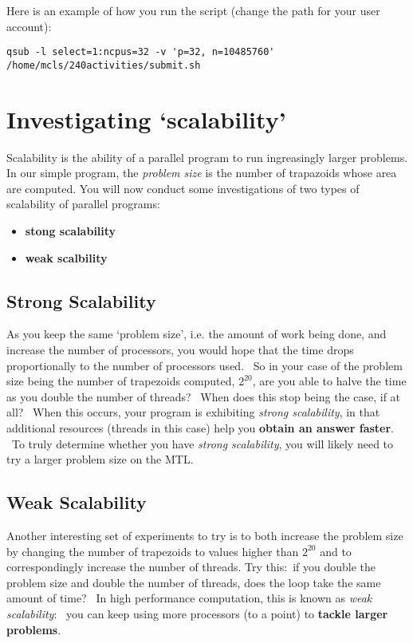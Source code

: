 \documentclass[letterpaper,10pt,openany,oneside]{sphinxmanual}
\begin{document}
Here is an example of how you run the script (change the path for your
user account):

\begin{Verbatim}[commandchars=\\\{\}]
qsub -l select=1:ncpus=32 -v 'p=32, n=10485760'
/home/mcls/240activities/submit.sh
\end{Verbatim}


\section{Investigating ‘scalability’}
\label{timingAndScalability/TimingOnMTLandscalability:investigating-scalability}
Scalability is the ability of a parallel program to run ingreasingly larger problems.  In our simple program, the \emph{problem size} is the number of trapazoids whose area are computed.  You will now conduct some investigations of two types of scalability of parallel programs:
\begin{itemize}
\item {} 
\textbf{stong scalability}

\item {} 
\textbf{weak scalbility}

\end{itemize}


\subsection{Strong Scalability}
\label{timingAndScalability/TimingOnMTLandscalability:strong-scalability}
As you keep the same ‘problem size’, i.e. the amount of work being done,
and increase the number of processors, you would hope that the time
drops proportionally to the number of processors used.  So in your case
of the problem size being the number of trapezoids computed, $2^{20}$, are
you able to halve the time as you double the number of threads?  When
does this stop being the case, if at all?  When this occurs, your
program is exhibiting \emph{strong scalability}, in that additional resources
(threads in this case) help you \textbf{obtain an answer faster}.  To truly
determine whether you have \emph{strong scalability}, you will likely need to
try a larger problem size on the MTL.


\subsection{Weak Scalability}
\label{timingAndScalability/TimingOnMTLandscalability:weak-scalability}
Another interesting set of experiments to try is to both increase the problem size
by changing the number of trapezoids to values higher than $2^{20}$ and to correspondingly increase the number of threads. Try
this: if you double the problem size and double the number of threads,
does the loop take the same amount of time?  In high performance
computation, this is known as \emph{weak scalability}:  you can keep using more
processors (to a point) to \textbf{tackle larger problems}.
\end{document}
